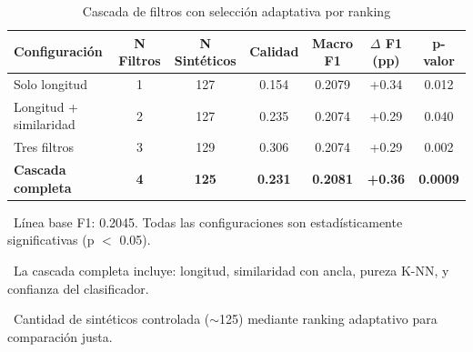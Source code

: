 \begin{table}[htbp]
\centering
\caption{Cascada de filtros con selección adaptativa por ranking}
\label{tab:filter_cascade}
\begin{tabular}{lcccccc}
\toprule
\textbf{Configuración} & \textbf{N Filtros} & \textbf{N Sintéticos} & \textbf{Calidad} & \textbf{Macro F1} & \textbf{$\Delta$ F1 (pp)} & \textbf{p-valor} \\
\midrule
Solo longitud & 1 & 127 & 0.154 & 0.2079 & +0.34 & 0.012 \\
Longitud + similaridad & 2 & 127 & 0.235 & 0.2074 & +0.29 & 0.040 \\
Tres filtros & 3 & 129 & 0.306 & 0.2074 & +0.29 & 0.002 \\
\rowcolor{green!20}
\textbf{Cascada completa} & \textbf{4} & \textbf{125} & \textbf{0.231} & \textbf{0.2081} & \textbf{+0.36} & \textbf{0.0009} \\
\bottomrule
\end{tabular}
\vspace{0.5em}\footnotesize

\textbullet\ Línea base F1: 0.2045. Todas las configuraciones son estadísticamente significativas (p $<$ 0.05).

\textbullet\ La cascada completa incluye: longitud, similaridad con ancla, pureza K-NN, y confianza del clasificador.

\textbullet\ Cantidad de sintéticos controlada ($\sim$125) mediante ranking adaptativo para comparación justa.

\end{table}
